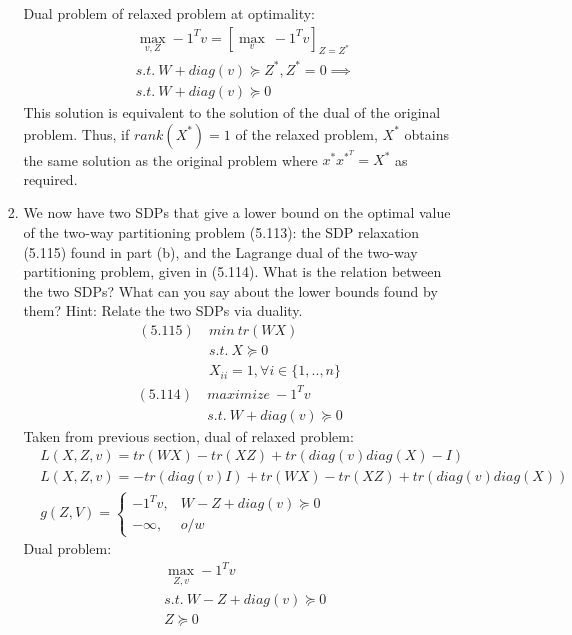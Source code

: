 \documentclass[12pt,letter]{article}
\begin{document}
\begin{enumerate}
\begin{enumerate}
\begin{enumerate}
    Dual problem of relaxed problem at optimality:
    \begin{align*}
      &\max_{v,Z} -1^T v = [\max_{v}\ -1^T v]_{Z=Z^*}\\
      &s.t.\ W + diag(v) \succeq Z^*, Z^*=0 \implies \\
      &s.t.\ W + diag(v) \succeq 0
    \end{align*}
    This solution is equivalent to the solution of the dual of the original problem. Thus, if $rank(X^*)=1$ of the relaxed problem, $X^*$ obtains the same solution as the original problem where $x^*x^*^T=X^*$ as required.
    \pagebreak
  \item
    We now have two SDPs that give a lower bound on the optimal value of the two-way partitioning problem (5.113): the SDP relaxation (5.115) found in part (b), and the Lagrange dual of the two-way partitioning problem, given in (5.114). What is the relation between the two SDPs? What can you say about the lower bounds found by them? Hint: Relate the two SDPs via duality.
    \begin{align*}
      (5.115)\ &min\ tr(W X)\\
               &s.t.\ X \succeq 0\\
               &X_{ii} = 1, \forall i \in \{1,..,n\}
    \end{align*}
    \begin{align*}
      (5.114)\ &maximize\ -1^T v\\
               &s.t.\ W + diag(v) \succeq 0
    \end{align*}    
    Taken from previous section, dual of relaxed problem:
    \begin{align*}
      &L(X,Z,v) = tr(WX) - tr(XZ) + tr(diag(v)diag(X)-I)\\
      &L(X,Z,v) = -tr(diag(v)I) + tr(WX) - tr(XZ) + tr(diag(v)diag(X))\\
      &g(Z,V) =
        \begin{cases}
          -1^T v ,& W - Z + diag(v) \succeq 0\\
          -\infty ,& o/w
        \end{cases}
    \end{align*}
    Dual problem:
    \begin{align*}
      &\max_{Z,v} -1^T v\\
      &s.t.\ W - Z + diag(v) \succeq 0\\
        &Z \succeq 0
      \end{align*}


\end{enumerate}
\end{enumerate}
\end{enumerate}
\end{document}

